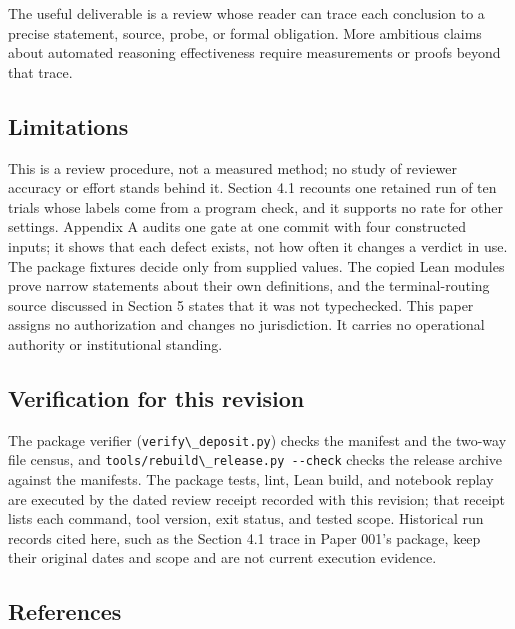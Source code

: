\documentclass[
  11pt,
]{article}
\newcommand{\passthrough}[1]{#1}
\begin{document}
The useful deliverable is a review whose reader can trace each
conclusion to a precise statement, source, probe, or formal obligation.
More ambitious claims about automated reasoning effectiveness require
measurements or proofs beyond that trace.

\subsection{Limitations}\label{limitations}

This is a review procedure, not a measured method; no study of reviewer
accuracy or effort stands behind it. Section 4.1 recounts one retained
run of ten trials whose labels come from a program check, and it
supports no rate for other settings. Appendix A audits one gate at one
commit with four constructed inputs; it shows that each defect exists,
not how often it changes a verdict in use. The package fixtures decide
only from supplied values. The copied Lean modules prove narrow
statements about their own definitions, and the terminal-routing source
discussed in Section 5 states that it was not typechecked. This paper
assigns no authorization and changes no jurisdiction. It carries no
operational authority or institutional standing.

\subsection{Verification for this
revision}\label{verification-for-this-revision}

The package verifier (\passthrough{\lstinline!verify\_deposit.py!})
checks the manifest and the two-way file census, and
\passthrough{\lstinline!tools/rebuild\_release.py --check!} checks the
release archive against the manifests. The package tests, lint, Lean
build, and notebook replay are executed by the dated review receipt
recorded with this revision; that receipt lists each command, tool
version, exit status, and tested scope. Historical run records cited
here, such as the Section 4.1 trace in Paper 001's package, keep their
original dates and scope and are not current execution evidence.

\subsection{References}\label{references}
\end{document}
